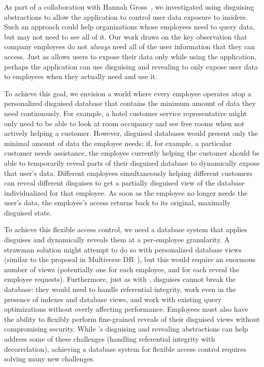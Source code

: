 %
As part of a collaboration with Hannah Gross~\cite{funhouse}, we investigated
using disguising abstractions to allow the application to control user data
exposure to insiders. Such an approach could help organizations whose employees
need to query data, but may not need to see all of it.
%
Our work draws on the key observation that company employees do not
\emph{always} need all of the user information that they can access.
%
Just as \sys allows users to expose their data only while using the application,
perhaps the application can use disguising and revealing to only expose user
data to employees when they actually need and use it.
%

%
To achieve this goal, we envision a world where every employee operates atop a
personalized disguised database that contains the minimum amount of data they
need continuously. For example, a hotel customer service representative might
only need to be able to look at room occupancy and see free rooms when not
actively helping a customer.
%
%
However, disguised databases would present only the minimal amount of data the
employee needs; if, for example, a particular customer needs assistance, the
employee currently helping the customer should be able to temporarily reveal
parts of their disguised database to dynamically expose that user's data.
%
Different employees simultaneously helping different customers can reveal
different disguises to get a partially disguised view of the database
individualized for that employee.
%
As soon as the employee no longer needs the user's data, the employee’s access
returns back to its original, maximally disguised state.
%

%
To achieve this flexible access control, we need a database system that applies
disguises and dynamically reveals them at a per-employee granularity.
%
A strawman solution might attempt to do so with personalized database views
(similar to the proposal in Multiverse DB~\cite{multiverse}), but this would
require an enormous number of views (potentially one for each employee, and for
each reveal the employee requests).
%
Furthermore, just as with \sys, disguises cannot break the database: they would
need to handle referential integrity, work even in the presence of indexes and
database views, and work with existing query optimizations without overly
affecting performance.
%
Employees must also have the ability to flexibly perform fine-grained reveals of
their disguised views without compromising security.
%
While \sys's disguising and revealing abstractions can help address some of
these challenges (\eg handling referential integrity with decorrelation),
achieving a database system for flexible access control requires solving many
new challenges.

